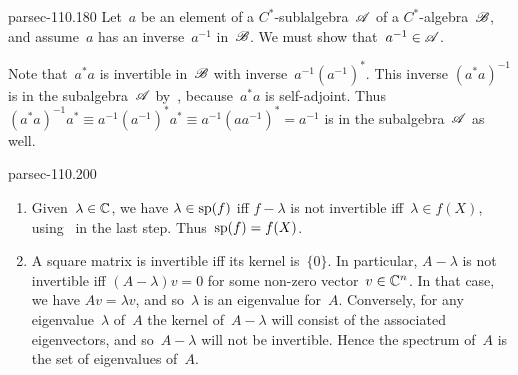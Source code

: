 \documentclass[b5page]{book}
\begin{document}
\begin{solution}{parsec-110.180}
Let~$a$ be an element of a $C^*$-sublalgebra~$\mathscr{A}$
of a $C^*$-algebra~$\mathscr{B}$,
    and assume~$a$ has an inverse~$a^{-1}$ in~$\mathscr{B}$.
    We must show that~$a^{-1}\in\mathscr{A}$.

Note that~$a^*a$ is invertible in~$\mathscr{B}$
    with inverse~$a^{-1} (a^{-1})^*$.
This inverse
$(a^*a)^{-1}$ is in the subalgebra~$\mathscr{A}$
by~,
because~$a^*a$ is self-adjoint.
    Thus~$(a^*a)^{-1}a^*\equiv a^{-1} (a^{-1})^* a^*
    \equiv a^{-1} (aa^{-1})^* = a^{-1}$
    is in the subalgebra~$\mathscr{A}$ as well.
\end{solution}
\begin{solution}{parsec-110.200}
\begin{enumerate}
    \item
Given~$\lambda\in\mathbb{C}$, we have
        $\lambda \in \mathrm{sp}(f)$
        iff $f-\lambda$ is not invertible
        iff~$\lambda \in f(X)$,
using~ in the last step.
        Thus~$\mathrm{sp}(f)=f(X)$.
    \item
        A square matrix is invertible iff its kernel is~$\{0\}$.
In particular, $A-\lambda$
        is not invertible iff $(A-\lambda)v=0$
        for some non-zero vector~$v\in \mathbb{C}^n$.
In that case, we have $Av=\lambda v$, and so~$\lambda$
is an eigenvalue for~$A$.  Conversely,
for any eigenvalue~$\lambda$ of~$A$
the kernel of~$A-\lambda$ will consist
of the associated eigenvectors, and so~$A-\lambda$ will not be invertible.
Hence the spectrum of~$A$ 
is the set of eigenvalues of~$A$.
\end{enumerate}
\end{solution}
\end{document}
